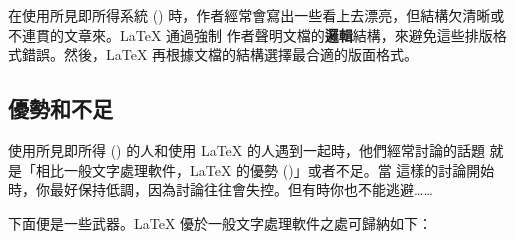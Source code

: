 在使用所見即所得系統 () 時，作者經常會寫出一些看上去漂亮，但結構欠清晰或不連貫的文章來。\LaTeX{} 通過強制
作者聲明文檔的\textbf{邏輯}結構，來避免這些排版格式錯誤。然後，\LaTeX{} 再根據文檔的結構選擇最合適的版面格式。

\subsection{優勢和不足}


使用所見即所得 () 的人和使用 \LaTeX{} 的人遇到一起時，他們經常討論的話題
就是「相比一般文字處理軟件，\LaTeX{} 的優勢 ()」或者不足。當
這樣的討論開始時，你最好保持低調，因為討論往往會失控。但有時你也不能逃避……


下面便是一些武器。\LaTeX{} 優於一般文字處理軟件之處可歸納如下：

%
%

